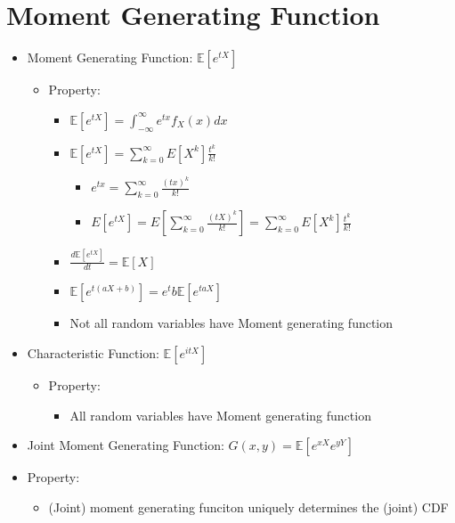 \documentclass[a4paper]{article}
\begin{document}
\section{Moment Generating Function}
\begin{itemize}
    \item Moment Generating Function: $\mathbb{E}[e^{tX}]$
        \begin{itemize}
            \item Property:
                \begin{itemize}
                    \item $\mathbb{E}[e^{tX}] = \int_{-\infty}^\infty e^{tx} f_X(x) dx$
                    \item $\mathbb{E}[e^{tX}] = \sum_{k=0}^\infty \mathit{E}[X^k] \frac{t^k}{k!}$
                        \begin{itemize}
                            \item $e^{tx} = \sum_{k=0}^\infty \frac{(tx)^k}{k!}$
                            \item $\mathit{E}[e^{tX}] = \mathit{E}[\sum_{k=0}^\infty \frac{(tX)^k}{k!}] = \sum_{k=0}^\infty \mathit{E}[X^k] \frac{t^k}{k!}$
                        \end{itemize}
                    \item $\frac{d\mathbb{E}[e^{tX}]}{dt} = \mathbb{E}[X]$
                    \item $\mathbb{E}[e^{t(aX+b)}] = e^tb\mathbb{E}[e^{taX}]$
                    \item Not all random variables have Moment generating function
                \end{itemize}
        \end{itemize}
    \item Characteristic Function: $\mathbb{E}[e^{itX}]$
        \begin{itemize}
            \item Property:
                \begin{itemize}
                    \item All random variables have Moment generating function
                \end{itemize}
        \end{itemize}
    \item Joint Moment Generating Function: $G(x, y) = \mathbb{E}[e^{xX}e^{yY}]$
    \item Property:
        \begin{itemize}
            \item (Joint) moment generating funciton uniquely determines the (joint) CDF

\end{itemize}
\end{itemize}
\end{document}
